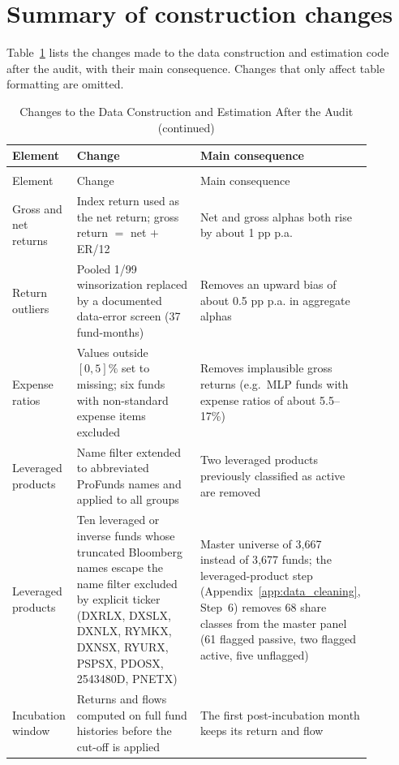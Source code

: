 \documentclass[12pt, oneside]{report}
\newcommand{\tablefont}{\fontsize{9}{11}\selectfont}  %
\begin{document}
\section{Summary of construction changes}
\label{sec:k_changes}

\noindent Table~\ref{tab:k_changes} lists the changes made to the data
construction and estimation code after the audit, with their main
consequence. Changes that only affect table formatting are omitted.

{\tablefont
\begin{longtable}{>{\raggedright\arraybackslash}p{0.16\linewidth}>{\raggedright\arraybackslash}p{0.36\linewidth}>{\raggedright\arraybackslash}p{0.36\linewidth}}
\caption{Changes to the Data Construction and Estimation After the Audit}\label{tab:k_changes}\\
\toprule
Element & Change & Main consequence \\
\midrule
\endfirsthead
\caption[]{Changes to the Data Construction and Estimation After the Audit (continued)}\\
\toprule
Element & Change & Main consequence \\
\midrule
\endhead
\bottomrule
\endfoot
Gross and net returns & Index return used as the net return; gross return $=$ net $+$ ER/12 & Net and gross alphas both rise by about 1 pp p.a. \\
Return outliers & Pooled 1/99 winsorization replaced by a documented data-error screen (37 fund-months) & Removes an upward bias of about 0.5 pp p.a. in aggregate alphas \\
Expense ratios & Values outside $[0, 5]\%$ set to missing; six funds with non-standard expense items excluded & Removes implausible gross returns (e.g.\ MLP funds with expense ratios of about 5.5--17\%) \\
Leveraged products & Name filter extended to abbreviated ProFunds names and applied to all groups & Two leveraged products previously classified as active are removed \\
Leveraged products & Ten leveraged or inverse funds whose truncated Bloomberg names escape the name filter excluded by explicit ticker (DXRLX, DXSLX, DXNLX, RYMKX, DXNSX, RYURX, PSPSX, PDOSX, 2543480D, PNETX) & Master universe of 3{,}667 instead of 3{,}677 funds; the leveraged-product step (Appendix~\ref{app:data_cleaning}, Step~6) removes 68 share classes from the master panel (61 flagged passive, two flagged active, five unflagged) \\
Incubation window & Returns and flows computed on full fund histories before the \textcite{Evans2010} cut-off is applied & The first post-incubation month keeps its return and flow \\

\end{longtable}}
\end{document}

